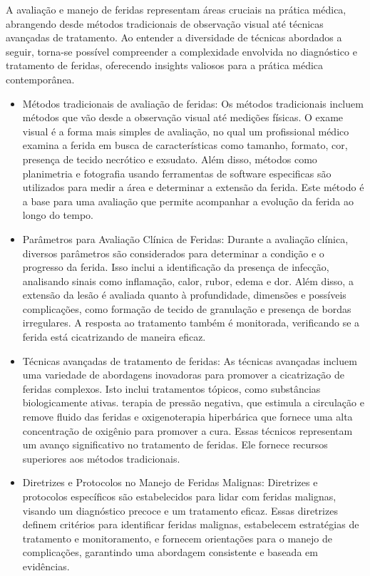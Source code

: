 A avaliação e manejo de feridas representam áreas cruciais na prática médica, abrangendo desde métodos tradicionais de observação visual até técnicas avançadas de tratamento. Ao entender a diversidade de técnicas abordados a seguir, torna-se possível compreender a complexidade envolvida no diagnóstico e tratamento de feridas, oferecendo insights valiosos para a prática médica contemporânea. 

\begin{itemize} 

    \item Métodos tradicionais de avaliação de feridas: Os métodos tradicionais incluem métodos que vão desde a observação visual até medições físicas. O exame visual é a forma mais simples de avaliação, no qual um profissional médico examina a ferida em busca de  características como tamanho, formato, cor, presença de tecido necrótico e exsudato. Além disso, métodos como planimetria e fotografia usando ferramentas de software especificas são utilizados para medir a área e determinar a extensão da ferida. Este método é a base para uma avaliação que permite acompanhar a evolução da ferida ao longo do tempo.

    \item Parâmetros para Avaliação Clínica de Feridas: Durante a avaliação clínica, diversos parâmetros são considerados para determinar a condição e o progresso da ferida. Isso inclui a identificação da presença de infecção, analisando sinais como inflamação, calor, rubor, edema e dor. Além disso, a extensão da lesão é avaliada quanto à profundidade, dimensões e possíveis complicações, como formação de tecido de granulação e presença de bordas irregulares. A resposta ao tratamento também é monitorada, verificando se a ferida está cicatrizando de maneira eficaz.

    \item Técnicas avançadas de tratamento de feridas: As técnicas avançadas incluem uma variedade de abordagens inovadoras para promover a cicatrização de feridas complexos. Isto inclui tratamentos tópicos, como substâncias biologicamente ativas. terapia de pressão negativa, que estimula a circulação e remove fluido das feridas e oxigenoterapia hiperbárica que fornece uma alta concentração de oxigênio para promover a cura. Essas técnicos representam um avanço significativo no tratamento de feridas. Ele fornece recursos superiores aos métodos tradicionais.

    \item Diretrizes e Protocolos no Manejo de Feridas Malignas: Diretrizes e protocolos específicos são estabelecidos para lidar com feridas malignas, visando um diagnóstico precoce e um tratamento eficaz. Essas diretrizes definem critérios para identificar feridas malignas, estabelecem estratégias de tratamento e monitoramento, e fornecem orientações para o manejo de complicações, garantindo uma abordagem consistente e baseada em evidências.


\end{itemize}

